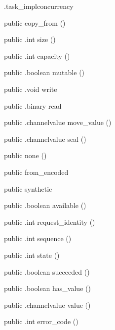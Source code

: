 \begin{CrexxClass}{.task\_impl}{concurrency}
\begin{Members}
    \Factory
      {public}
      {copy\_from}
      {()}

    \Method
      {public}
      {.int}
      {size}
      {()}

    \Method
      {public}
      {.int}
      {capacity}
      {()}

    \Method
      {public}
      {.boolean}
      {mutable}
      {()}

    \Method
      {public}
      {.void}
      {write}
      {}

    \Method
      {public}
      {.binary}
      {read}
      {}

    \Method
      {public}
      {.channelvalue}
      {move\_value}
      {()}

    \Method
      {public}
      {.channelvalue}
      {seal}
      {()}

    \Factory
      {public}
      {none}
      {()}

    \Factory
      {public}
      {from\_encoded}
      {}

    \Factory
      {public}
      {synthetic}
      {}

    \Method
      {public}
      {.boolean}
      {available}
      {()}

    \Method
      {public}
      {.int}
      {request\_identity}
      {()}

    \Method
      {public}
      {.int}
      {sequence}
      {()}

    \Method
      {public}
      {.int}
      {state}
      {()}

    \Method
      {public}
      {.boolean}
      {succeeded}
      {()}

    \Method
      {public}
      {.boolean}
      {has\_value}
      {()}

    \Method
      {public}
      {.channelvalue}
      {value}
      {()}

    \Method
      {public}
      {.int}
      {error\_code}
      {()}


\end{Members}
\end{CrexxClass}
